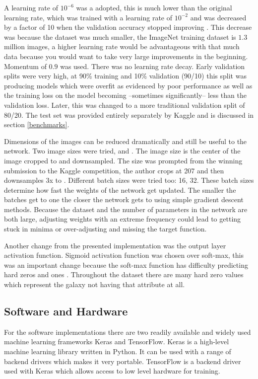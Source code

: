 A learning rate of $10^{{-6}}$ was a adopted, this is much lower than the original \vgg learning rate, which was trained with a learning rate of $10^{{-2}}$ and was decreased by a factor of 10 when the validation accuracy stopped improving \cite{vgg16-arxiv}. This decrease was because the dataset was much smaller, the ImageNet training dataset is $1.3$ million images, a higher learning rate would be advantageous with that much data because you would want to take very large improvements in the beginning. Momentum of $0.9$ was used. There was no learning rate decay. Early validation splits were very high, at 90\% training and 10\% validation (90/10) this split was producing models which were overfit as evidenced by poor performance as well as the training loss on the model becoming --sometimes significantly-- less than the validation loss. Later, this was changed to a more traditional validation split of 80/20. The test set was provided entirely separately by Kaggle and is discussed in section \ref{benchmarks}.

Dimensions of the images can be reduced dramatically and still be useful to the network. Two image sizes were tried,  and . The  image size is the center of the image cropped to  and downsampled. The  size was prompted from the winning submission to the Kaggle competition, the author crops at 207 and then downsamples 3x to  \cite{kaggle-winner}. Different batch sizes were tried too: 16, 32. These batch sizes determine how fast the weights of the network get updated. The smaller the batches get to one the closer the network gets to using simple gradient descent methods. Because the dataset and the number of parameters in the network are both large, adjusting weights with an extreme frequency could lead to getting stuck in minima or over-adjusting and missing the target function.

Another change from the presented \vgg implementation was the output layer activation function. Sigmoid activation function was chosen over soft-max, this was an important change because the soft-max function has difficulty predicting hard zeros and ones \cite{kaggle-winner}. Throughout the dataset there are many hard zero values which represent the galaxy not having that attribute at all.

\subsection{Software and Hardware}\label{hard-soft-ware}
For the software implementations there are two readily available and widely used machine learning frameworks Keras and TensorFlow. Keras is a high-level machine learning library written in Python. It can be used with a range of backend drivers which makes it very portable. TensorFlow is a backend driver used with Keras which allows access to low level hardware for training.

